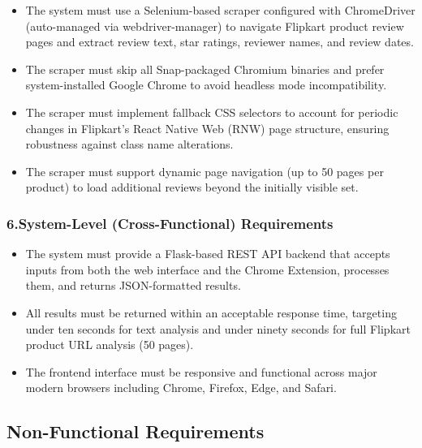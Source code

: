 \documentclass[12pt,a4paper]{report}
\begin{document}
\begin{itemize}
  \item The system must use a Selenium-based scraper configured with ChromeDriver (auto-managed via webdriver-manager) to navigate Flipkart product review pages and extract review text, star ratings, reviewer names, and review dates.

  \item The scraper must skip all Snap-packaged Chromium binaries and prefer system-installed Google Chrome to avoid headless mode incompatibility.

  \item The scraper must implement fallback CSS selectors to account for periodic changes in Flipkart's React Native Web (RNW) page structure, ensuring robustness against class name alterations.

  \item The scraper must support dynamic page navigation (up to 50 pages per product) to load additional reviews beyond the initially visible set.
\end{itemize}

\subsubsection*{6.\quad System-Level (Cross-Functional) Requirements}

\begin{itemize}
  \item The system must provide a Flask-based REST API backend that accepts inputs from both the web interface and the Chrome Extension, processes them, and returns JSON-formatted results.

  \item All results must be returned within an acceptable response time, targeting under ten seconds for text analysis and under ninety seconds for full Flipkart product URL analysis (50 pages).

  \item The frontend interface must be responsive and functional across major modern browsers including Chrome, Firefox, Edge, and Safari.
\end{itemize}

\subsection{Non-Functional Requirements}
\end{document}
